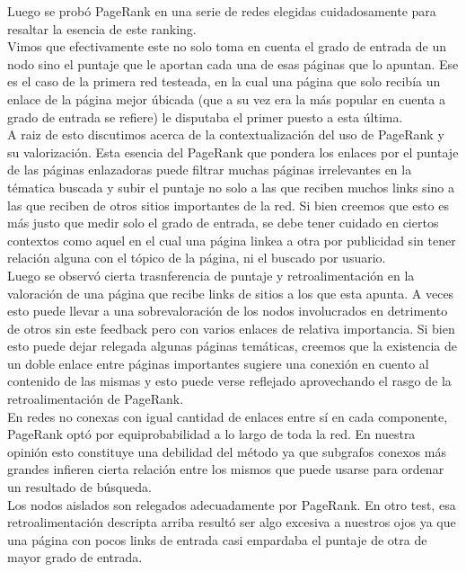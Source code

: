 Luego se probó PageRank en una serie de redes elegidas cuidadosamente para resaltar la esencia de este ranking. \\
Vimos que efectivamente este no solo toma en cuenta el grado de entrada de un nodo sino el puntaje que le aportan cada una de esas páginas que lo apuntan. Ese es el caso de la primera red testeada, en la cual una página que solo recibía un enlace de la página mejor úbicada (que a su vez era la más popular en cuenta a grado de entrada se refiere) le disputaba el primer puesto a esta última.\\
A raiz de esto discutimos acerca de la contextualización del uso de PageRank y su valorización. Esta esencia del PageRank que pondera los enlaces por el puntaje de las páginas enlazadoras puede filtrar muchas páginas irrelevantes en la tématica buscada y subir el puntaje no solo a las que reciben muchos links sino a las que reciben de otros sitios importantes de la red. Si bien creemos que esto es más justo que medir solo el grado de entrada, se debe tener cuidado en ciertos contextos como aquel en el cual una página linkea a otra por publicidad sin tener relación alguna con el tópico de la página, ni el buscado por usuario. \\

Luego se observó cierta trasnferencia de puntaje y retroalimentación en la valoración de una página que recibe links de sitios a los que esta apunta. A veces esto puede llevar a una sobrevaloración de los nodos involucrados en detrimento de otros sin este feedback pero con varios enlaces de relativa importancia. Si bien esto puede dejar relegada algunas páginas temáticas, creemos que la existencia de un doble enlace entre páginas importantes sugiere una conexión en cuento al contenido de las mismas y esto puede verse reflejado aprovechando el rasgo de la retroalimentación de PageRank. \\

En redes no conexas con igual cantidad de enlaces entre sí en cada componente, PageRank optó por equiprobabilidad a lo largo de toda la red. En nuestra opinión esto constituye una debilidad del método ya que subgrafos conexos más grandes infieren cierta relación entre los mismos que puede usarse para ordenar un resultado de búsqueda. \\

Los nodos aislados son relegados adecuadamente por PageRank. En otro test, esa retroalimentación descripta arriba resultó ser algo excesiva a nuestros ojos ya que una página con pocos links de entrada casi empardaba el puntaje de otra de mayor grado de entrada. \\

